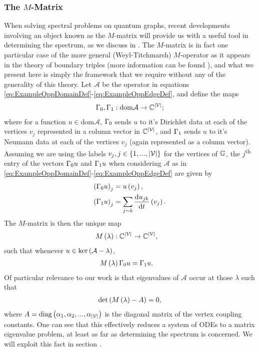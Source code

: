 \subsubsection{The $M$-Matrix} \label{sssec:MMatrix}
When solving spectral problems on quantum graphs, recent developments involving an object known as the $M$-matrix will provide us with a useful tool in determining the spectrum, as we discuss in .
The $M$-matrix is in fact one particular case of the more general (Weyl-Titchmarsh) $M$-operator as it appears in the theory of boundary triples (more information can be found ), and what we present here is simply the framework that we require without any of the generality of this theory.
Let $\mathcal{A}$ be the operator in equations \eqref{eq:ExampleOppDomainDef}-\eqref{eq:ExampleOppEdgeDef}, and define the maps
\begin{align*}
	\Gamma_0, \Gamma_1: \mathrm{dom}\mathcal{A} \rightarrow \mathbb{C}^{\left\lvert \mathcal{V} \right\rvert};
\end{align*}
where for a function $u\in\mathrm{dom}\mathcal{A}$, $\Gamma_0$ sends $u$ to it's Dirichlet data at each of the vertices $v_j$ represented in a column vector in $\mathbb{C}^{\left\lvert \mathcal{V} \right\rvert}$, and $\Gamma_1$ sends $u$ to it's Neumann data at each of the vertices $v_j$ (again represented as a column vector).
Assuming we are using the labels $v_j, j\in\left\{ 1,...,\left\lvert \mathcal{V} \right\rvert \right\}$ for the vertices of $\mathbb{G}$, the $j$\textsuperscript{th} entry of the vectors $\Gamma_0 u$ and $\Gamma_1 u$ when considering $\mathcal{A}$ as in \eqref{eq:ExampleOppDomainDef}-\eqref{eq:ExampleOppEdgeDef} are given by
\begin{align*}
	\left( \Gamma_0 u \right)_j &= u\left( v_j \right), \\
	\left( \Gamma_1 u \right)_j &= \sum_{j\sim k}\dfrac{\mathrm{d}u_{jk}}{\mathrm{d}t}\left( v_j \right).
\end{align*}
The $M$-matrix is then the unique map
\begin{align*}
	M\left( \lambda \right):\mathbb{C}^{\left\lvert \mathcal{V} \right\rvert} &\rightarrow \mathbb{C}^{\left\lvert \mathcal{V} \right\rvert},
\end{align*}
such that whenever $u\in\mathrm{ker}\left( \mathcal{A}-\lambda \right)$,
\begin{align*}
	M\left( \lambda \right)\Gamma_0 u &= \Gamma_1 u.
\end{align*}
Of particular relevance to our work is that eigenvalues of $\mathcal{A}$ occur at those $\lambda$ such that 
\begin{align*}
	\mathrm{det}\left( M\left( \lambda \right) - A \right)= 0,
\end{align*}
where $A = \mathrm{diag}\left( \alpha_1, \alpha_2, ... , \alpha_{\left\lvert \mathcal{V} \right\rvert} \right)$ is the diagonal matrix of the vertex coupling constants.
One can see that this effectively reduces a system of ODEs to a matrix eigenvalue problem, at least as far as determining the spectrum is concerned.
We will exploit this fact in section .


